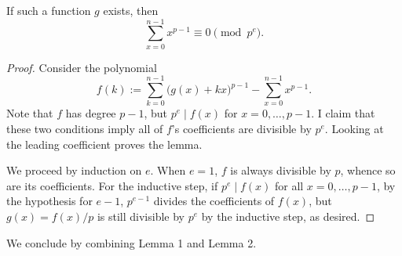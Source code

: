 \begin{boxlemma}
    If such a function $g$ exists, then \[\sum_{x=0}^{n-1}x^{p-1}\equiv0\pmod{p^e}.\]
\end{boxlemma}
\begin{proof}
    Consider the polynomial \[f(k):=\sum_{k=0}^{n-1}\Big(g(x)+kx\Big)^{p-1}-\sum_{x=0}^{n-1}x^{p-1}.\]
    Note that $f$ has degree $p-1$, but $p^e\mid f(x)$ for $x=0,\ldots,p-1$. I claim that these two conditions imply all of $f$'s coefficients are divisible by $p^e$. Looking at the leading coefficient proves the lemma.

    We proceed by induction on $e$. When $e=1$, $f$ is always divisible by $p$, whence so are its coefficients. For the inductive step, if $p^e\mid f(x)$ for all $x=0,\ldots,p-1$, by the hypothesis for $e-1$, $p^{e-1}$ divides the coefficients of $f(x)$, but $g(x)=f(x)/p$ is still divisible by $p^e$ by the inductive step, as desired.
\end{proof}

We conclude by combining Lemma 1 and Lemma 2.

